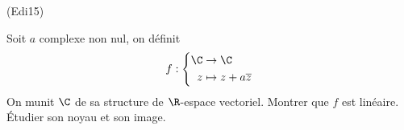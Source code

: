 \begin{tiny}(Edi15)\end{tiny} Soit $a$ complexe non nul, on définit
\begin{displaymath}
   f:
 \left\lbrace 
 \begin{aligned}
   \C &\rightarrow \C \\ z&\mapsto z+a\overline{z}
 \end{aligned}
\right. 
 \end{displaymath}
On munit $\C$ de sa structure de $\R$-espace vectoriel. Montrer que $f$ est linéaire. \'Etudier son noyau et son image.
